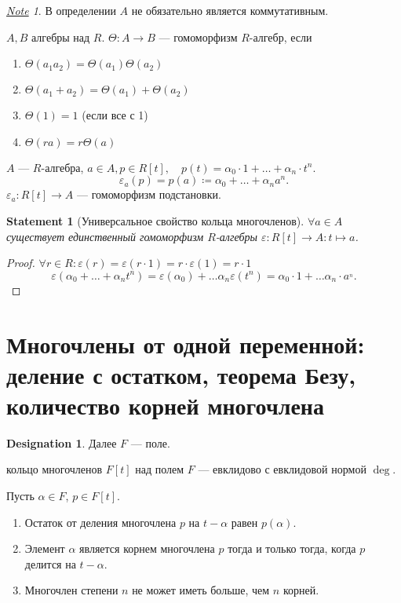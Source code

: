 \documentclass[11pt]{book}
\theoremstyle{definition}
\theoremstyle{plain}
\theoremstyle{plain}
\newtheorem{st}{Statement}
\theoremstyle{definition}
\newtheorem*{name}{Designation}
\theoremstyle{remark}
\newtheorem*{note}{\underline{Note}}
\begin{document}
\begin{note}
    В определении $ A$ не обязательно является коммутативным.
\end{note}
\begin{defn}
    $ A, B$ алгебры над $ R$.
    $\Theta : A \to  B$
    --- гомоморфизм $ R$-алгебр, если
    \begin{enumerate}[noitemsep]
	\item $ \Theta(a_1a_2) =\Theta (a_1) \Theta(a_2) $
	\item $ \Theta(a_1+a_2) = \Theta(a_1) + \Theta(a_2)$
	\item $ \Theta (1) = 1 $ (если все с 1)
	\item  $ \Theta(ra) = r \Theta(a)$
    \end{enumerate}
\end{defn}
\begin{defn}
    $ A$ --- $ R$-алгебра, $ a \in  A, p \in  R[t], \quad p(t) = \alpha _0 \cdot  1 + \ldots + \alpha _n \cdot  t ^{n}$.
    \[
	\varepsilon _a(p) = p(a) \coloneqq \alpha _0 + \ldots + \alpha _n a^{n}
    .\]
    $ \varepsilon _a: R[t] \to  A$ --- гомоморфизм подстановки.
\end{defn}
\begin{st}[Универсальное свойство кольца многочленов]
    $
    \forall  a \in  A
    $ существует единственный гомоморфизм $ R $-алгебры  $ \varepsilon : R[t] \to A: t \mapsto a$.
\end{st}
\begin{proof}
    $ \forall  r \in  R: \varepsilon (r) = \varepsilon (r \cdot 1) = r \cdot  \varepsilon (1) = r \cdot  1$
    \[
	\varepsilon ( \alpha _0 + \ldots  + \alpha _n t ^{n}) = \varepsilon ( \alpha _0) + \ldots  \alpha _n \varepsilon ( t ^{n}) =  \alpha _0 \cdot  1 + \ldots \alpha _n \cdot  a^{_n}
    .\]
\end{proof}
\section{Многочлены от одной переменной: деление с остатком, теорема Безу, количество корней многочлена}
\begin{name}
    Далее $ F$  --- поле.
\end{name}
\begin{thm}
    кольцо многочленов $ F[t]$  над полем $ F $ --- евклидово с евклидовой нормой $ \deg$.
\end{thm}
\begin{thm}[Безу]
    Пусть $ \alpha \in F$, $ p \in F[t]$.
    \begin{enumerate}[noitemsep]
	\item
	    Остаток от деления многочлена $ p$ на $ t - \alpha $ равен $ p(\alpha)$.
	\item Элемент $ \alpha $ является корнем многочлена $ p$  тогда и только тогда, когда $ p$ делится на  $ t- \alpha $.
	\item Многочлен степени $ n$ не может иметь больше, чем  $ n$ корней.
    \end{enumerate}
\end{thm}
\end{document}
